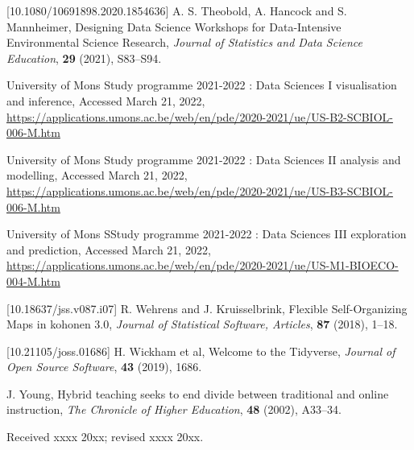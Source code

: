 \documentclass{aims}
\theoremstyle{definition}
\begin{document}
\begin{thebibliography}{99}
 [10.1080/10691898.2020.1854636]
     \newblock A. S. Theobold, A. Hancock and S. Mannheimer,
     \newblock  Designing Data Science Workshops for Data-Intensive Environmental Science Research,
     \newblock \emph{Journal of Statistics and Data Science Education}, \textbf{29} (2021), S83--S94.

    \newblock University of Mons
    \newblock Study programme 2021-2022 : Data Sciences I visualisation and inference,
    \newblock Accessed March 21, 2022,
    \newblock \url{https://applications.umons.ac.be/web/en/pde/2020-2021/ue/US-B2-SCBIOL-006-M.htm}

    \newblock University of Mons
    \newblock Study programme 2021-2022 : Data Sciences II analysis and modelling,
    \newblock Accessed March 21, 2022,
    \newblock \url{https://applications.umons.ac.be/web/en/pde/2020-2021/ue/US-B3-SCBIOL-006-M.htm}

    \newblock University of Mons
    \newblock SStudy programme 2021-2022 : Data {Sciences} {III} exploration and prediction,
    \newblock Accessed March 21, 2022,
    \newblock \url{https://applications.umons.ac.be/web/en/pde/2020-2021/ue/US-M1-BIOECO-004-M.htm}

 [10.18637/jss.v087.i07]
     \newblock R. Wehrens and J. Kruisselbrink,
     \newblock  Flexible Self-Organizing Maps in kohonen 3.0,
     \newblock \emph{Journal of Statistical Software, Articles}, \textbf{87} (2018), 1--18.

 [10.21105/joss.01686]
     \newblock H. Wickham et al,
     \newblock  Welcome to the Tidyverse,
     \newblock \emph{Journal of Open Source Software}, \textbf{43} (2019), 1686.

     \newblock  J. Young,
     \newblock Hybrid teaching seeks to end divide between traditional and online instruction,
     \newblock \emph{The Chronicle of Higher Education}, \textbf{48} (2002), A33--34.

\end{thebibliography}

\medskip
Received xxxx 20xx; revised xxxx 20xx.
\medskip
\end{document}
